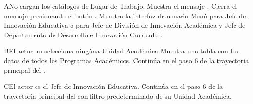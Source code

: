 \begin{UCtrayectoriaA}{A}{No cargan los catálogos de Lugar de Trabajo.}
    \UCpaso Muestra el mensaje .
    \UCpaso[\UCactor] Cierra el mensaje presionando el botón .
     \UCpaso Muestra la interfaz de usuario Menú para Jefe de Innovación Educativa  o  para Jefe de División de Innovación Académica y Jefe de Departamento de Desarrollo e Innovación Curricular.
\end{UCtrayectoriaA}

\begin{UCtrayectoriaA}{B}{El actor no selecciona ningúna Unidad Académica}
    \UCpaso Muestra una tabla con los datos de todos los Programas Académicos.
    \UCpaso Continúa en el paso 6 de la trayectoria principal del .
\end{UCtrayectoriaA}

\begin{UCtrayectoriaA}{C}{El actor es el Jefe de Innovación Educativa.}
    \UCpaso Continúa en el paso 6 de la trayectoria principal del  con filtro predeterminado de su Unidad Académica.
\end{UCtrayectoriaA}
